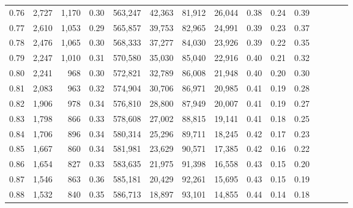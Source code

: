 \begin{tabular}{rrrcrrrrrrrrrrr}
0.76 &   2,727 &  1,170 &                                       0.30 &  563,247 &   42,363 &   81,912 &   26,044 &  0.38 &  0.24 &                         0.39 \\
0.77 &   2,610 &  1,053 &                                       0.29 &  565,857 &   39,753 &   82,965 &   24,991 &  0.39 &  0.23 &                         0.37 \\
0.78 &   2,476 &  1,065 &                                       0.30 &  568,333 &   37,277 &   84,030 &   23,926 &  0.39 &  0.22 &                         0.35 \\
0.79 &   2,247 &  1,010 &                                       0.31 &  570,580 &   35,030 &   85,040 &   22,916 &  0.40 &  0.21 &                         0.32 \\
0.80 &   2,241 &    968 &                                       0.30 &  572,821 &   32,789 &   86,008 &   21,948 &  0.40 &  0.20 &                         0.30 \\
0.81 &   2,083 &    963 &                                       0.32 &  574,904 &   30,706 &   86,971 &   20,985 &  0.41 &  0.19 &                         0.28 \\
0.82 &   1,906 &    978 &                                       0.34 &  576,810 &   28,800 &   87,949 &   20,007 &  0.41 &  0.19 &                         0.27 \\
0.83 &   1,798 &    866 &                                       0.33 &  578,608 &   27,002 &   88,815 &   19,141 &  0.41 &  0.18 &                         0.25 \\
0.84 &   1,706 &    896 &                                       0.34 &  580,314 &   25,296 &   89,711 &   18,245 &  0.42 &  0.17 &                         0.23 \\
0.85 &   1,667 &    860 &                                       0.34 &  581,981 &   23,629 &   90,571 &   17,385 &  0.42 &  0.16 &                         0.22 \\
0.86 &   1,654 &    827 &                                       0.33 &  583,635 &   21,975 &   91,398 &   16,558 &  0.43 &  0.15 &                         0.20 \\
0.87 &   1,546 &    863 &                                       0.36 &  585,181 &   20,429 &   92,261 &   15,695 &  0.43 &  0.15 &                         0.19 \\
0.88 &   1,532 &    840 &                                       0.35 &  586,713 &   18,897 &   93,101 &   14,855 &  0.44 &  0.14 &                         0.18 \\

\end{tabular}

